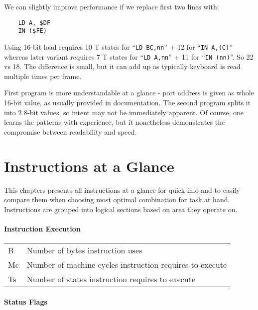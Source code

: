 \documentclass[twoside,openright,a4paper]{book}
\newcommand{\notet}{\rule{0pt}{2.4ex}}
\begin{document}
We can slightly improve performance if we replace first two lines with:

\begin{Verbatim}
	LD A, $DF
	IN ($FE)
\end{Verbatim}

Using 16-bit load requires 10 T states for ``{\tt LD BC,nn}'' + 12 for ``{\tt IN A,(C)}'' whereas later variant requires 7 T states for ``{\tt LD A,nn}'' + 11 for ``{\tt IN (nn)}''. So 22 vs 18. The difference is small, but it can add up as typically keyboard is read multiple times per frame.

First program is more understandable at a glance - port address is given as whole 16-bit value, as usually provided in documentation. The second program splits it into 2 8-bit values, so intent may not be immediately apparent. Of course, one learns the patterns with experience, but it nonetheless demonstrates the compromise between readability and speed.



\chapter{Instructions at a Glance}

This chapters presents all instructions at a glance for quick info and to easily compare them when choosing most optimal combination for task at hand. Instructions are grouped into logical sections based on area they operate on.

\minitoc

\pagebreak

\newcommand{\FS}{$\updownarrow$}
\newcommand{\FN}{$\bullet$}

\subsubsection{Instruction Execution}

\begin{tabular}{ll}
	B & 
		Number of bytes instruction uses \\
	Mc\notet & 
		Number of machine cycles instruction requires to execute \\
	Ts\notet & 
		Number of states instruction requires to execute \\
\end{tabular}

\subsubsection{Status Flags}
\end{document}
